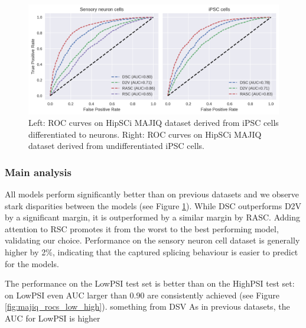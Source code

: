\begin{figure}
	\centering\includegraphics[width=1\textwidth]{../visualizations/ch5-results/majiq_neuron_ipsc_cross_model_roc_auc_comparison.png} 
	\caption{Left: ROC curves on HipSCi MAJIQ dataset derived from iPSC cells differentiated to neurons. Right: ROC curves on HipSCi MAJIQ dataset derived from undifferentiated iPSC cells. }
	\label{fig:majiq_rocs}
\end{figure}

\subsubsection{Main analysis}
All models perform significantly better than on previous datasets and we observe stark disparities between the models (see Figure \ref{fig:majiq_rocs}). While DSC outperforms D2V by a significant margin, it is outperformed by a similar margin by RASC. Adding attention to RSC promotes it from the worst to the best performing model, validating our choice. Performance on the sensory neuron cell dataset is generally higher by 2\%, indicating that the captured splicing behaviour is easier to predict for the models. %

The performance on the LowPSI test set is better than on the HighPSI test set: on LowPSI even AUC larger than 0.90 are consistently achieved (see Figure \ref{fig:majiq_rocs_low_high}). something from DSV  
As in previous datasets, the AUC for LowPSI is higher 


